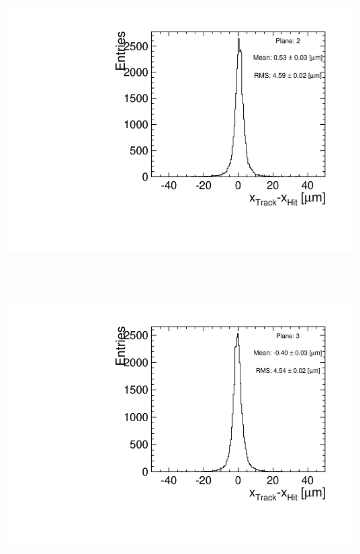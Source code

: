 \begin{figure}[htbp]
\begin{subfigure}[b]{0.3\textwidth}
    \includegraphics[width=\textwidth]{figures/Telescope/biasedResiduals/BiasedResiduals_run49_PlaneXRMS2.pdf}
    \caption{}
  \end{subfigure} \\
  \begin{subfigure}[b]{0.3\textwidth}
    \includegraphics[width=\textwidth]{figures/Telescope/biasedResiduals/BiasedResiduals_run49_PlaneXRMS3.pdf}
    \caption{}
  \end{subfigure}\hfill
  \begin{subfigure}[b]{0.3\textwidth}

\end{subfigure}
\end{figure}
